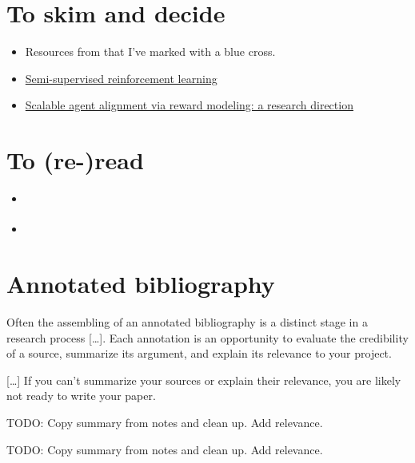 \documentclass{farlamp}
\begin{document}
\section{To skim and decide}

\begin{itemize}
\item Resources from \textcite{CSASupAmp} that I've marked with a blue cross.
\item
    \href{https://ai-alignment.com/semi-supervised-reinforcement-learning-cf7d5375197f}{Semi-supervised reinforcement learning}
\item \href{https://arxiv.org/abs/1811.07871}{Scalable agent alignment via
    reward modeling: a research direction}
\end{itemize}


\section{To (re-)read}

\begin{itemize}
    \item \cite{ChriREngP}
    \item \cite{ChriThoRewE}
\end{itemize}


\section{Annotated bibliography}

\begin{displayquote}
    Often the assembling of an annotated bibliography is a distinct stage in a
    research process […]. Each annotation is an opportunity to evaluate the
    credibility of a source, summarize its argument, and explain its relevance
    to your project.

    […] If you can't summarize your sources or explain their relevance, you are
likely not ready to write your paper.
\end{displayquote}

TODO: Copy summary from notes and clean up. Add relevance.

TODO: Copy summary from notes and clean up. Add relevance.


\begin{FlushLeft}
    \printbibliography[notcategory=annotated]
\end{FlushLeft}
\end{document}
